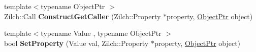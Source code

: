 \begin{DoxyCompactItemize}
\item 
\hypertarget{classDCEngine_1_1Systems_1_1ZilchInterface_a498ccf75b315c5124acefd40f40f0d2d}{{\footnotesize template$<$typename Object\-Ptr $>$ }\\Zilch\-::\-Call {\bfseries Construct\-Get\-Caller} (Zilch\-::\-Property $\ast$property, \hyperlink{classDCEngine_1_1Object}{Object\-Ptr} object)}\label{classDCEngine_1_1Systems_1_1ZilchInterface_a498ccf75b315c5124acefd40f40f0d2d}

\item 
\hypertarget{classDCEngine_1_1Systems_1_1ZilchInterface_a3967de2558bb9b555df4c1dc19cdbf36}{{\footnotesize template$<$typename Value , typename Object\-Ptr $>$ }\\bool {\bfseries Set\-Property} (Value val, Zilch\-::\-Property $\ast$property, \hyperlink{classDCEngine_1_1Object}{Object\-Ptr} object)}\label{classDCEngine_1_1Systems_1_1ZilchInterface_a3967de2558bb9b555df4c1dc19cdbf36}


\end{DoxyCompactItemize}
